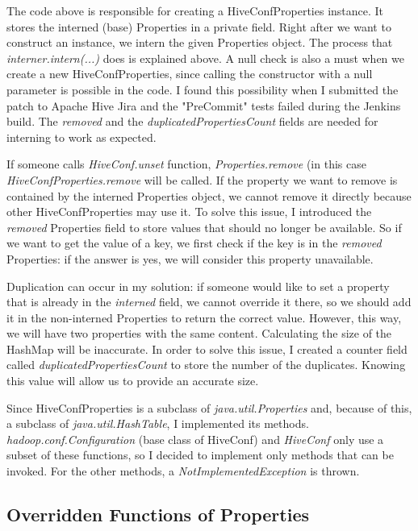 The code above is responsible for creating a HiveConfProperties instance. It stores the interned (base) Properties in a private field. Right after we want to construct an instance, we intern the given Properties object. The process that \textit{interner.intern(...)} does is explained above. A null check is also a must when we create a new HiveConfProperties, since calling the constructor with a null parameter is possible in the code. I found this possibility when I submitted the patch to Apache Hive Jira and the "PreCommit" tests failed during the Jenkins build. The \textit{removed} and the \textit{duplicatedPropertiesCount} fields are needed for interning to work as expected. 

If someone calls \textit{HiveConf.unset} function, \textit{Properties.remove} (in this case \textit{HiveConfProperties.remove} will be called. If the property we want to remove is contained by the interned Properties object, we cannot remove it directly because other HiveConfProperties may use it. To solve this issue, I introduced the \textit{removed} Properties field to store values that should no longer be available. So if we want to get the value of a key, we first check if the key is in the \textit{removed} Properties: if the answer is yes, we will consider this property unavailable.

Duplication can occur in my solution: if someone would like to set a property that is already in the \textit{interned} field, we cannot override it there, so we should add it in the non-interned Properties to return the correct value. However, this way, we will have two properties with the same content. Calculating the size of the HashMap will be inaccurate. In order to solve this issue, I created a counter field called \textit{duplicatedPropertiesCount} to store the number of the duplicates. Knowing this value will allow us to provide an accurate size. 

Since HiveConfProperties is a subclass of \textit{java.util.Properties} and, because of this, a subclass of \textit{java.util.HashTable}, I implemented its methods.  \textit{hadoop.conf.Configuration} (base class of HiveConf) and \textit{HiveConf} only use a subset of these functions, so I decided to implement only methods that can be invoked. For the other methods, a \textit{NotImplementedException} is thrown.  

\subsection{Overridden Functions of Properties}
